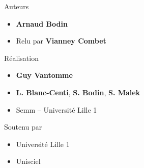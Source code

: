 \begin{frame}
\begin{minipage}{0.90\textwidth}
  Auteurs
  \begin{itemize}
  \item {\bf Arnaud Bodin}

  
  \item Relu par {\bf Vianney Combet} 
     
  \end{itemize}

  \smallskip

  Réalisation
  \begin{itemize}
    \item {\bf Guy Vantomme}
    \item {\bf L. Blanc-Centi}, {\bf S. Bodin}, {\bf S. Malek} 
    \item Semm -- Université Lille 1
  \end{itemize}

  \smallskip

  Soutenu par 
  \begin{itemize}
    \item Université Lille 1
    \item Unisciel
  \end{itemize}

  \end{minipage}  



\end{frame}


